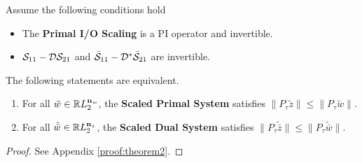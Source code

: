 \begin{theorem}\label{thm:dualscaledIO}
	Assume the following conditions hold
	\begin{itemize}
		\item The \textbf{Primal I/O Scaling} is a PI operator and invertible.
		\item $\mathcal{S}_{11} - \mathcal{D}\mathcal{S}_{21}$ and $\bar{\mathcal{S}}_{11} - \mathcal{D}^*\bar{\mathcal{S}}_{21}$ are invertible.
	\end{itemize}
	The following statements are equivalent.
	\begin{enumerate}
		\item For all $\tilde{w}\in\mathbb{R} L_2^{\mathbf{n}_w}$, the \textbf{Scaled Primal System}
		      satisfies $\|P_\tau\tilde{z}\| \leq \|P_\tau\tilde{w}\|$.
		\item For all $\tilde{\bar{w}}\in\mathbb{R} L_2^{\mathbf{n}_z}$, the \textbf{Scaled Dual System}
		      satisfies $\|P_\tau\tilde{\bar{z}}\| \leq \|P_\tau\tilde{\bar{w}}\|$.
	\end{enumerate}
\end{theorem}
\begin{proof}
	See Appendix \ref{proof:theorem2}.
\end{proof}

